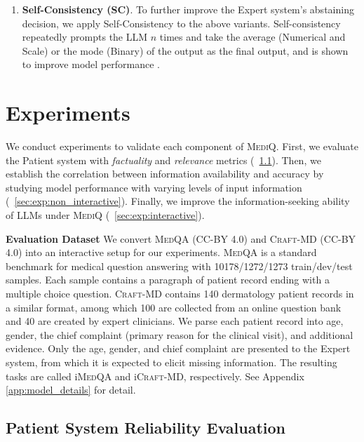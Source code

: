 \documentclass{article}
\newcommand{\Sref}[1]{\textsection~\ref{#1}}
\begin{document}
\begin{enumerate}
\item[\textbf{5.}] \textbf{Self-Consistency (SC)}. To further improve the Expert system's abstaining decision, we apply Self-Consistency to the above variants. Self-consistency repeatedly prompts the LLM $n$ times and take the average (Numerical and Scale) or the mode (Binary) of the output as the final output, and is shown to improve model performance \citep{wang2022self}.
\end{enumerate}



\section{Experiments}\label{sec:experiments}\vspace{-0.5mm}
We conduct experiments to validate each component of \textsc{MediQ}. 
First, we evaluate the Patient system with \emph{factuality} and \emph{relevance} metrics (\Sref{sec:exp:patient_setup}). 
Then, we establish the correlation between information availability and accuracy by studying model performance with varying levels of input information (\Sref{sec:exp:non_interactive}).  Finally, we improve the information-seeking ability of LLMs under \textsc{MediQ} (\Sref{sec:exp:interactive}).



\textbf{Evaluation Dataset}\hspace{3mm}
We convert \textsc{MedQA} (CC-BY 4.0) \citep{jin2021disease} and \textsc{Craft-MD} (CC-BY 4.0) \citep{johri2023testing, johri2024craftmd} into an interactive setup for our experiments. \textsc{MedQA} is a standard benchmark for medical question answering 
with 10178/1272/1273 train/dev/test samples. Each sample contains a paragraph of patient record ending with a multiple choice question. 
\textsc{Craft-MD} contains 140 dermatology patient records in a similar format, among which 100 are collected from an online question bank and 40 are created by expert clinicians.
We parse each patient record into age, gender, the chief complaint (primary reason for the clinical visit), and additional evidence. Only the age, gender, and chief complaint are presented to the Expert system, from which it is expected to elicit missing information. The resulting tasks are called i\textsc{MedQA} and i\textsc{Craft-MD}, respectively. See Appendix \ref{app:model_details} for detail.


\subsection{Patient System Reliability Evaluation}
\label{sec:exp:patient_setup}\vspace{-0.5mm}
\end{document}
